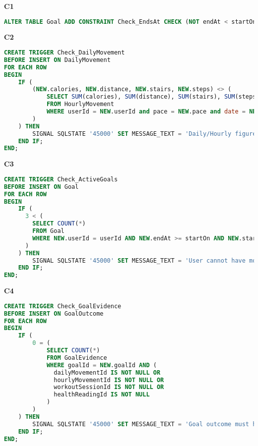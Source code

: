\documentclass{article}
\begin{document}
\textbf{\small{C1}}
\begin{lstlisting}[language=sql]
ALTER TABLE Goal ADD CONSTRAINT Check_EndsAt CHECK (NOT endAt < startOn);
\end{lstlisting}
\textbf{\small{C2}}
\begin{lstlisting}[language=sql]
CREATE TRIGGER Check_DailyMovement
BEFORE INSERT ON DailyMovement
FOR EACH ROW
BEGIN
    IF (
        (NEW.calories, NEW.distance, NEW.stairs, NEW.steps) <> (
            SELECT SUM(calories), SUM(distance), SUM(stairs), SUM(steps) 
            FROM HourlyMovement
            WHERE userId = NEW.userId and pace = NEW.pace and date = NEW.date
        )
    ) THEN
        SIGNAL SQLSTATE '45000' SET MESSAGE_TEXT = 'Daily/Hourly figures are not consistent';
    END IF;
END;
\end{lstlisting}
\textbf{\small{C3}}
\begin{lstlisting}[language=sql]
CREATE TRIGGER Check_ActiveGoals
BEFORE INSERT ON Goal
FOR EACH ROW
BEGIN
    IF (
      3 < (
        SELECT COUNT(*) 
        FROM Goal 
        WHERE NEW.userId = userId AND NEW.endAt >= startOn AND NEW.startOn <= endAt
      ) 
    ) THEN
        SIGNAL SQLSTATE '45000' SET MESSAGE_TEXT = 'User cannot have more than 3 active goals';
    END IF;
END;
\end{lstlisting}
\textbf{\small{C4}}
\begin{lstlisting}[language=sql]
CREATE TRIGGER Check_GoalEvidence
BEFORE INSERT ON GoalOutcome
FOR EACH ROW
BEGIN
    IF (  
        0 = (
            SELECT COUNT(*) 
            FROM GoalEvidence 
            WHERE goalId = NEW.goalId AND (
              dailyMovementId IS NOT NULL OR 
              hourlyMovementId IS NOT NULL OR 
              workoutSessionId IS NOT NULL OR 
              healthReadingId IS NOT NULL
            )
        )
    ) THEN
        SIGNAL SQLSTATE '45000' SET MESSAGE_TEXT = 'Goal outcome must have evidence';
    END IF;
END;
\end{lstlisting}

\pagebreak 
\end{document}
